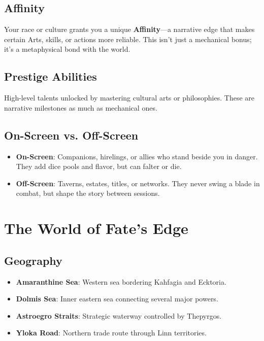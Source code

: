 \documentclass[11pt,twoside]{article}
\begin{document}
\subsection{Affinity}
Your race or culture grants you a unique \textbf{Affinity}—a narrative edge that makes certain Arts, skills, or actions more reliable. This isn't just a mechanical bonus; it's a metaphysical bond with the world.

\subsection{Prestige Abilities}
High-level talents unlocked by mastering cultural arts or philosophies. These are narrative milestones as much as mechanical ones.

\subsection{On-Screen vs. Off-Screen}
\begin{itemize}[leftmargin=*]
    \item \textbf{On-Screen}: Companions, hirelings, or allies who stand beside you in danger. They add dice pools and flavor, but can falter or die.
    \item \textbf{Off-Screen}: Taverns, estates, titles, or networks. They never swing a blade in combat, but shape the story between sessions.
\end{itemize}

\section{The World of Fate's Edge}

\subsection{Geography}
\begin{itemize}[leftmargin=*]
    \item \textbf{Amaranthine Sea}: Western sea bordering Kahfagia and Ecktoria.
    \item \textbf{Dolmis Sea}: Inner eastern sea connecting several major powers.
    \item \textbf{Astroegro Straits}: Strategic waterway controlled by Thepyrgos.
    \item \textbf{Yloka Road}: Northern trade route through Linn territories.
\end{itemize}
\end{document}
